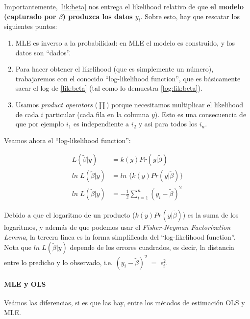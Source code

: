 \documentclass[onesided]{article}\usepackage[]{graphicx}\usepackage[]{color}
\begin{document}
Importantemente, \autoref{lik:beta} nos entrega el likelihood relativo de que {\bf el modelo (capturado por $\beta$) produzca los datos $y_{i}$}. Sobre esto, hay que rescatar los siguientes puntos:

\begin{enumerate}
  \item MLE es inverso a la probabilidad: en MLE el modelo es construido, y los datos son ``dados''. 
  \item Para hacer obtener el likelihood (que es simplemente un n\'umero), trabajaremos con el conocido ``log-likelihood function'', que es b\'asicamente sacar el log de \autoref{lik:beta} (tal como lo demuestra \autoref{log:lik:beta}).
  \item Usamos \emph{product operators} ($\prod$) porque necesitamos multiplicar el likelihood de cada $i$ particular (cada fila en la columna $y$). Esto es una consecuencia de que por ejemplo $i_{1}$ es independiente a $i_{2}$ y asi para todos los $i_{n}$.
\end{enumerate}

Veamos ahora el ``log-likelihood function'':


\begin{equation} \label{log:lik:beta}
\begin{split}
L(\tilde{\beta}|y) & = k(y)Pr(y|\tilde{\beta})\\
ln \; L(\tilde{\beta}|y) & = ln \; \bigg\{  k(y)Pr(y|\tilde{\beta}) \bigg\} \\
ln \; L(\tilde{\beta}|y) & = -\frac{1}{2} \sum_{i=1}^{n}(y_{i}-\tilde{\beta})^{2}
\end{split}
\end{equation}

Debido a que el logaritmo de un producto ($k(y)Pr(y|\tilde{\beta})$) es la suma de los logaritmos, y adem\'as de que podemos usar el \emph{Fisher-Neyman Factorization Lemma}, la tercera l\'inea es la forma simplificada del ``log-likelihood function''. Nota que $ln \; L(\tilde{\beta}|y)$ depende de los errores cuadrados, es decir, la distancia entre lo predicho y lo observado, i.e. $(y_{i}-\tilde{\beta})^{2} \;=\; \epsilon^{2}_{i}$.

\paragraph{MLE y OLS} Ve\'amos las diferencias, si es que las hay, entre los m\'etodos de estimaci\'on OLS y MLE.
\end{document}
